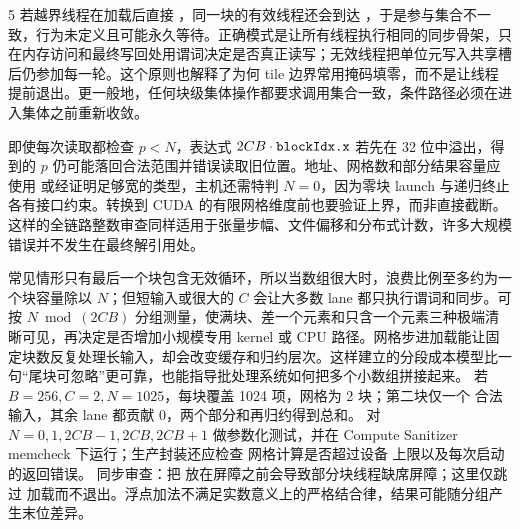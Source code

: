 \begin{solutionexercise}{5}
若越界线程在加载后直接 ，同一块的有效线程还会到达 ，于是参与集合不一致，行为未定义且可能永久等待。正确模式是让所有线程执行相同的同步骨架，只在内存访问和最终写回处用谓词决定是否真正读写；无效线程把单位元写入共享槽后仍参加每一轮。这个原则也解释了为何 tile 边界常用掩码填零，而不是让线程提前退出。更一般地，任何块级集体操作都要求调用集合一致，条件路径必须在进入集体之前重新收敛。

即使每次读取都检查 $p<N$，表达式 $2CB\cdot\code{blockIdx.x}$ 若先在 32 位中溢出，得到的 $p$ 仍可能落回合法范围并错误读取旧位置。地址、网格数和部分结果容量应使用  或经证明足够宽的类型，主机还需特判 $N=0$，因为零块 launch 与递归终止各有接口约束。转换到 CUDA 的有限网格维度前也要验证上界，而非直接截断。这样的全链路整数审查同样适用于张量步幅、文件偏移和分布式计数，许多大规模错误并不发生在最终解引用处。

常见情形只有最后一个块包含无效循环，所以当数组很大时，浪费比例至多约为一个块容量除以 $N$；但短输入或很大的 $C$ 会让大多数 lane 都只执行谓词和同步。可按 $N\bmod(2CB)$ 分组测量，使满块、差一个元素和只含一个元素三种极端清晰可见，再决定是否增加小规模专用 kernel 或 CPU 路径。网格步进加载能让固定块数反复处理长输入，却会改变缓存和归约层次。这样建立的分段成本模型比一句“尾块可忽略”更可靠，也能指导批处理系统如何把多个小数组拼接起来。
\variantheading 若 $B=256,C=2,N=1025$，每块覆盖 1024 项，网格为 2 块；第二块仅一个
合法输入，其余 lane 都贡献 0，两个部分和再归约得到总和。
\practiceheading 对 $N=0,1,2CB-1,2CB,2CB+1$ 做参数化测试，并在 Compute Sanitizer
memcheck 下运行；生产封装还应检查  网格计算是否超过设备 
上限以及每次启动的返回错误。
同步审查：把  放在屏障之前会导致部分块线程缺席屏障；这里仅跳过
加载而不退出。浮点加法不满足实数意义上的严格结合律，结果可能随分组产生末位差异。
\end{solutionexercise}

